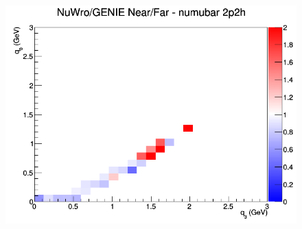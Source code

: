\documentclass[12pt]{article}
\begin{document}
\begin{figure}[h]
\endminipage
{}
\includegraphics[width=\linewidth]{q0_q3/nominal/ratios/2p2h_NuWro_GENIE_numubar_NF_q3_q0.png}
\endminipage
\newline
\end{figure}
\clearpage
\end{document}
